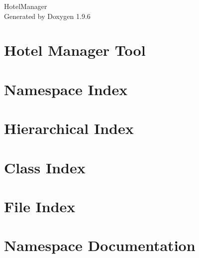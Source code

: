 \documentclass[twoside]{book}
\newcommand{\+}{\discretionary{\mbox{\scriptsize$\hookleftarrow$}}{}{}}
\newcommand{\clearemptydoublepage}{%
    \newpage{\pagestyle{empty}\cleardoublepage}%
  }
\begin{document}
  \raggedbottom
    \hypersetup{pageanchor=false,
                bookmarksnumbered=true,
                pdfencoding=unicode
               }
  \begin{titlepage}
  \vspace*{7cm}
  \begin{center}%
  {\Large Hotel\+Manager}\\
  \vspace*{1cm}
  {\large Generated by Doxygen 1.9.6}\\
  \end{center}
  \end{titlepage}
  \clearemptydoublepage
  \tableofcontents
  \clearemptydoublepage
  \hypersetup{pageanchor=true}
\chapter{Hotel Manager Tool}
\label{md__c___users_andon__documents__git_hub__b_s_p_q23__e5_2__r_e_a_d_m_e}

\chapter{Namespace Index}

\chapter{Hierarchical Index}

\chapter{Class Index}

\chapter{File Index}

\chapter{Namespace Documentation}











\end{document}
